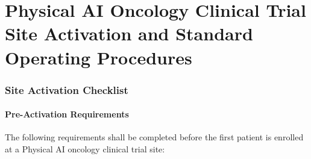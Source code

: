 

\part{Physical AI Oncology Clinical Trial Site Activation and Standard Operating Procedures}
\setcounter{section}{0}

\section{Site Activation Checklist}

\subsection{Pre-Activation Requirements}

The following requirements shall be completed before the first patient is
enrolled at a Physical AI oncology clinical trial site:

